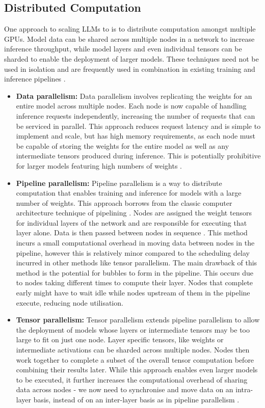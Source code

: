 \documentclass[12pt,twoside]{report}
\begin{document}
\subsection{Distributed Computation}
One approach to scaling LLMs to is to distribute computation amongst multiple GPUs. 
Model data can be shared across multiple nodes in a network to increase inference throughput, while model layers and even individual tensors can be sharded to enable the deployment of larger models.
These techniques need not be used in isolation and are frequently used in combination in existing training and inference pipelines \cite{kwon2023efficient} \cite{shoeybi2019megatron} \cite{yu2022orca}.
\begin{itemize}
  \item \textbf{Data parallelism:} Data parallelism involves replicating the weights for an entire model across multiple nodes.
    Each node is now capable of handling inference requests independently, increasing the number of requests that can be serviced in parallel.  
    This approach reduces request latency and is simple to implement and scale, but has high memory requirements, as each node must be capable of storing the weights for the entire model as well as any intermediate tensors produced during inference.
    This is potentially prohibitive for larger models featuring high numbers of weights \cite{rae2021scaling} \cite{brown2020language} \cite{chowdhery2023palm} .
  \item \textbf{Pipeline parallelism:} Pipeline parallelism is a way to distribute computation that enables training and inference for models with a large number of weights.
    This approach borrows from the classic computer architecture technique of pipelining \cite{hennessy2011computer}.
    Nodes are assigned the weight tensors for individual layers of the network and are responsible for executing that layer alone.
    Data is then passed between nodes in sequence \cite{huang2019gpipe}.
    This method incurs a small computational overhead in moving data between nodes in the pipeline, however this is relatively minor compared to the scheduling delay incurred in other methods like tensor parallelism.
    The main drawback of this method is the potential for bubbles to form in the pipeline.
    This occurs due to nodes taking different times to compute their layer.
    Nodes that complete early might have to wait idle while nodes upstream of them in the pipeline execute, reducing node utilisation.
  \item \textbf{Tensor parallelism:} Tensor parallelism extends pipeline parallelism to allow the deployment of models whose layers or intermediate tensors may be too large to fit on just one node.
    Layer specific tensors, like weights or intermediate activations can be sharded across multiple nodes. 
    Nodes then work together to complete a subset of the overall tensor computation before combining their results later.
    While this approach enables even larger models to be executed, it further increases the computational overhead of sharing data across nodes - we now need to synchronise and move data on an intra-layer basis, instead of on an inter-layer basis as in pipeline parallelism \cite{shoeybi2019megatron}.
\end{itemize}
\end{document}
